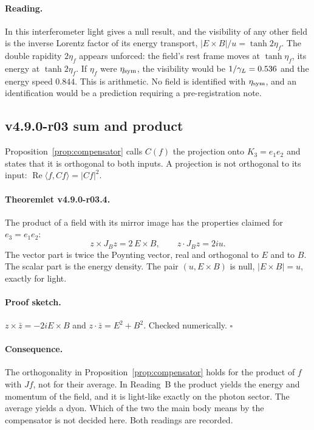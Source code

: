 \paragraph{Reading.}
In this interferometer light gives a null result, and the visibility of any other field is the inverse Lorentz factor of
its energy transport, \(|E\times B|/u=\tanh2\eta_f\).  The double rapidity \(2\eta_f\) appears unforced: the field's rest
frame moves at \(\tanh\eta_f\), its energy at \(\tanh2\eta_f\).  If \(\eta_f\) were \(\eta_{\rm sym}\), the visibility would be
\(1/\gamma_L=0.536\) and the energy speed \(0.844\).  This is arithmetic.  No field is identified with \(\eta_{\rm sym}\), and an
identification would be a prediction requiring a pre-registration note.

\subsection*{v4.9.0-r03 sum and product}
\label{subsec:v490-r03-product}

Proposition~\ref{prop:compensator} calls \(C(f)\) the projection onto \(K_3=e_1e_2\) and states that it is orthogonal to
both inputs.  A projection is not orthogonal to its input: \(\operatorname{Re}\langle f,Cf\rangle=|Cf|^2\).

\paragraph{Theoremlet v4.9.0-r03.4.}
The product of a field with its mirror image has the properties claimed for \(e_3=e_1e_2\):
\[
z\times J_Bz=2\,E\times B,\qquad z\cdot J_Bz=2iu .
\]
The vector part is twice the Poynting vector, real and orthogonal to \(E\) and to \(B\).  The scalar part is the energy
density.  The pair \((u,E\times B)\) is null, \(|E\times B|=u\), exactly for light.

\paragraph{Proof sketch.}
\(z\times\bar z=-2iE\times B\) and \(z\cdot\bar z=E^2+B^2\).  Checked numerically.  \(\square\)

\paragraph{Consequence.}
The orthogonality in Proposition~\ref{prop:compensator} holds for the product of \(f\) with \(Jf\), not for their
average.  In Reading~B the product yields the energy and momentum of the field, and it is light-like exactly on the
photon sector.  The average yields a dyon.  Which of the two the main body means by the compensator is not decided here.
Both readings are recorded.

